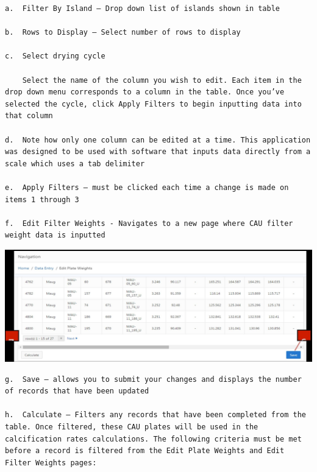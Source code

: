 \documentclass[
]{book}
\begin{document}
\begin{verbatim}
a.  Filter By Island – Drop down list of islands shown in table  

b.  Rows to Display – Select number of rows to display  

c.  Select drying cycle  

    Select the name of the column you wish to edit. Each item in the drop down menu corresponds to a column in the table. Once you’ve selected the cycle, click Apply Filters to begin inputting data into that column  

d.  Note how only one column can be edited at a time. This application was designed to be used with software that inputs data directly from a scale which uses a tab delimiter  

e.  Apply Filters – must be clicked each time a change is made on items 1 through 3  

f.  Edit Filter Weights - Navigates to a new page where CAU filter weight data is inputted  
\end{verbatim}

\includegraphics{images/Data4.jpg}

\begin{verbatim}
g.  Save – allows you to submit your changes and displays the number of records that have been updated  

h.  Calculate – Filters any records that have been completed from the table. Once filtered, these CAU plates will be used in the calcification rates calculations. The following criteria must be met before a record is filtered from the Edit Plate Weights and Edit Filter Weights pages:
\end{verbatim}
\end{document}
